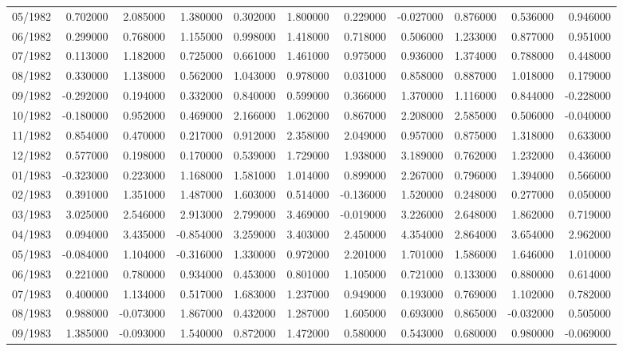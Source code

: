 \begin{tabular}{lrrrrrrrrrr}
05/1982 & 0.702000 & 2.085000 & 1.380000 & 0.302000 & 1.800000 & 0.229000 & -0.027000 & 0.876000 & 0.536000 & 0.946000 \\
06/1982 & 0.299000 & 0.768000 & 1.155000 & 0.998000 & 1.418000 & 0.718000 & 0.506000 & 1.233000 & 0.877000 & 0.951000 \\
07/1982 & 0.113000 & 1.182000 & 0.725000 & 0.661000 & 1.461000 & 0.975000 & 0.936000 & 1.374000 & 0.788000 & 0.448000 \\
08/1982 & 0.330000 & 1.138000 & 0.562000 & 1.043000 & 0.978000 & 0.031000 & 0.858000 & 0.887000 & 1.018000 & 0.179000 \\
09/1982 & -0.292000 & 0.194000 & 0.332000 & 0.840000 & 0.599000 & 0.366000 & 1.370000 & 1.116000 & 0.844000 & -0.228000 \\
10/1982 & -0.180000 & 0.952000 & 0.469000 & 2.166000 & 1.062000 & 0.867000 & 2.208000 & 2.585000 & 0.506000 & -0.040000 \\
11/1982 & 0.854000 & 0.470000 & 0.217000 & 0.912000 & 2.358000 & 2.049000 & 0.957000 & 0.875000 & 1.318000 & 0.633000 \\
12/1982 & 0.577000 & 0.198000 & 0.170000 & 0.539000 & 1.729000 & 1.938000 & 3.189000 & 0.762000 & 1.232000 & 0.436000 \\
01/1983 & -0.323000 & 0.223000 & 1.168000 & 1.581000 & 1.014000 & 0.899000 & 2.267000 & 0.796000 & 1.394000 & 0.566000 \\
02/1983 & 0.391000 & 1.351000 & 1.487000 & 1.603000 & 0.514000 & -0.136000 & 1.520000 & 0.248000 & 0.277000 & 0.050000 \\
03/1983 & 3.025000 & 2.546000 & 2.913000 & 2.799000 & 3.469000 & -0.019000 & 3.226000 & 2.648000 & 1.862000 & 0.719000 \\
04/1983 & 0.094000 & 3.435000 & -0.854000 & 3.259000 & 3.403000 & 2.450000 & 4.354000 & 2.864000 & 3.654000 & 2.962000 \\
05/1983 & -0.084000 & 1.104000 & -0.316000 & 1.330000 & 0.972000 & 2.201000 & 1.701000 & 1.586000 & 1.646000 & 1.010000 \\
06/1983 & 0.221000 & 0.780000 & 0.934000 & 0.453000 & 0.801000 & 1.105000 & 0.721000 & 0.133000 & 0.880000 & 0.614000 \\
07/1983 & 0.400000 & 1.134000 & 0.517000 & 1.683000 & 1.237000 & 0.949000 & 0.193000 & 0.769000 & 1.102000 & 0.782000 \\
08/1983 & 0.988000 & -0.073000 & 1.867000 & 0.432000 & 1.287000 & 1.605000 & 0.693000 & 0.865000 & -0.032000 & 0.505000 \\
09/1983 & 1.385000 & -0.093000 & 1.540000 & 0.872000 & 1.472000 & 0.580000 & 0.543000 & 0.680000 & 0.980000 & -0.069000 \\

\end{tabular}
